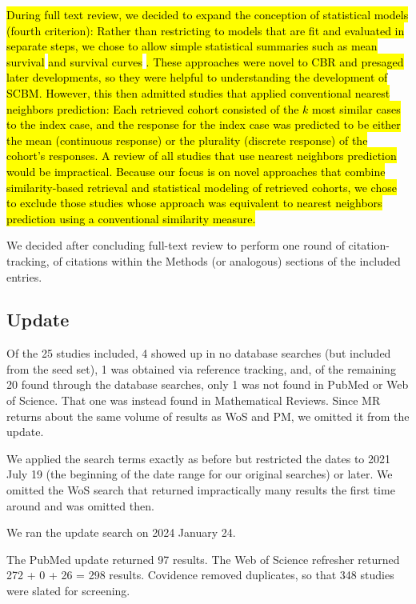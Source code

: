 \documentclass[sn-mathphys,Numbered,pdflatex]{sn-jnl}
\theoremstyle{remark}
\theoremstyle{definition}
\begin{document}
\hl{During full text review, we decided to expand the conception of statistical models (fourth criterion): Rather than restricting to models that are fit and evaluated in separate steps, we chose to allow simple statistical summaries such as mean survival }\citep{Mariuzzi1997}\hl{ and survival curves }\citep{Lowsky2013}\hl{. These approaches were novel to CBR and presaged later developments, so they were helpful to understanding the development of SCBM.
However, this then admitted studies that applied conventional nearest neighbors prediction: Each retrieved cohort consisted of the $k$ most similar cases to the index case, and the response for the index case was predicted to be either the mean (continuous response) or the plurality (discrete response) of the cohort's responses. A review of all studies that use nearest neighbors prediction would be impractical. Because our focus is on novel approaches that combine similarity-based retrieval and statistical modeling of retrieved cohorts, we chose to exclude those studies whose approach was equivalent to nearest neighbors prediction using a conventional similarity measure.}

We decided after concluding full-text review to perform one round of
citation-tracking, of citations within the Methods (or analogous)
sections of the included entries.

\subsection*{Update}\label{update}

Of the 25 studies included, 4 showed up in no database searches (but
included from the seed set), 1 was obtained via reference tracking, and,
of the remaining 20 found through the database searches, only 1 was not
found in PubMed or Web of Science. That one was instead found in
Mathematical Reviews. Since MR returns about the same volume of results
as WoS and PM, we omitted it from the update.

We applied the search terms exactly as before but restricted the dates
to 2021 July 19 (the beginning of the date range for our original
searches) or later. We omitted the WoS search that returned
impractically many results the first time around and was omitted then.

We ran the update search on 2024 January 24.

The PubMed update returned 97 results. The Web of Science refresher
returned 272 + 0 + 26 = 298 results. Covidence removed duplicates, so
that 348 studies were slated for screening.
\end{document}

